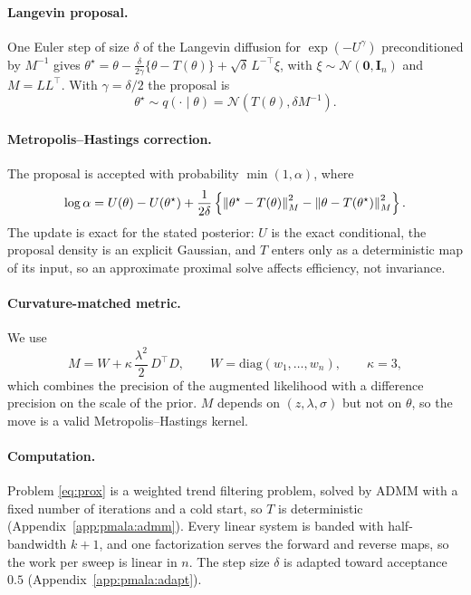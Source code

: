 \paragraph{Langevin proposal.} One Euler step of size $\delta$ of the Langevin diffusion for $\exp(-U^\gamma)$ preconditioned by $M^{-1}$ gives $\theta^\star = \theta - \frac{\delta}{2\gamma}\{\theta - T(\theta)\} + \sqrt{\delta}\, L^{-\top}\xi$, with $\xi \sim \mathcal{N}(\mathbf{0}, \mathbf{I}_n)$ and $M = L L^\top$. With $\gamma = \delta/2$ \citep{pereyra2016proximal} the proposal is
\begin{equation}
    \theta^\star \sim q(\cdot \mid \theta) = \mathcal{N}\!\left(T(\theta), \delta M^{-1}\right).
    \label{eq:pmala_proposal}
\end{equation}

\paragraph{Metropolis--Hastings correction.} The proposal is accepted with probability $\min(1,\alpha)$, where
\begin{equation}
    \log \alpha = U(\theta) - U(\theta^\star) + \frac{1}{2\delta}\left\{ \left\lVert\theta^\star - T(\theta)\right\rVert_M^2 - \left\lVert\theta - T(\theta^\star)\right\rVert_M^2 \right\}.
    \label{eq:pmala_accept}
\end{equation}
The update is exact for the stated posterior: $U$ is the exact conditional, the proposal density is an explicit Gaussian, and $T$ enters only as a deterministic map of its input, so an approximate proximal solve affects efficiency, not invariance.

\paragraph{Curvature-matched metric.} We use
\begin{equation}
    M = W + \kappa\, \frac{\lambda^2}{2}\, D^\top D, \qquad W = \mathrm{diag}(w_1, \ldots, w_n), \qquad \kappa = 3,
    \label{eq:metric}
\end{equation}
which combines the precision of the augmented likelihood with a difference precision on the scale of the prior. $M$ depends on $(z, \lambda, \sigma)$ but not on $\theta$, so the move is a valid Metropolis--Hastings kernel.

\paragraph{Computation.} Problem \eqref{eq:prox} is a weighted trend filtering problem, solved by ADMM with a fixed number of iterations and a cold start, so $T$ is deterministic (Appendix~\ref{app:pmala:admm}). Every linear system is banded with half-bandwidth $k+1$, and one factorization serves the forward and reverse maps, so the work per sweep is linear in $n$. The step size $\delta$ is adapted toward acceptance $0.5$ (Appendix~\ref{app:pmala:adapt}).


